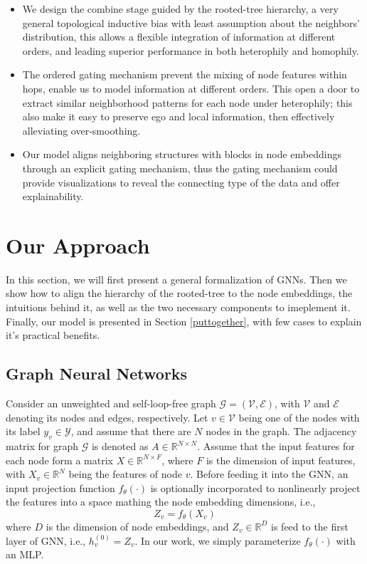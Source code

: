 \documentclass{article}
\begin{document}
\begin{itemize}
\item We design the combine stage guided by the rooted-tree hierarchy, a very general topological inductive bias with least assumption about the neighbors' distribution, this allows a flexible integration of information at different orders, and leading superior performance in both heterophily and homophily.


\item The ordered gating mechanism prevent the mixing of node features within hops, enable us to model information at different orders. This open a door to extract similar neighborhood patterns for each node under heterophily; this also make it easy to preserve ego and local information, then effectively alleviating over-smoothing.


\item Our model aligns neighboring structures with blocks in node embeddings through an explicit gating mechanism, thus the gating mechanism could provide visualizations to reveal the connecting type of the data and offer explainability.
\end{itemize}


\section{Our Approach}
In this section, we will first present a general formalization of GNNs. Then we show how to align the hierarchy of the rooted-tree to the node embeddings, the intuitions behind it, as well as the two necessary components to imeplement it. Finally, our model is presented in Section \ref{puttogether}, with few cases to explain it's practical benefits.

\subsection{Graph Neural Networks}
Consider an unweighted and self-loop-free graph $\mathcal{G}=(\mathcal{V},\mathcal{E})$, with $\mathcal{V}$ and $\mathcal{E}$ denoting its nodes and edges, respectively. Let $v \in \mathcal{V}$ being one of the nodes with its label $y_{v} \in \mathcal{Y}$, and assume that there are $N$ nodes in the graph. The adjacency matrix for graph $\mathcal{G}$ is denoted as $A \in \mathbb{R}^{N \times N}$.
Assume that the input features for each node form a matrix $X \in \mathbb{R}^{N \times F}$, where $F$ is the dimension of input features, with $X_v \in \mathbb{R}^N$ being the features of node $v$. Before feeding it into the GNN, an input projection function $f_{\theta}(\cdot)$ is optionally incorporated to nonlinearly project the features into a space mathing the node embedding dimensions, i.e., 
\begin{equation}
Z_v=f_{\theta}(X_v)
\end{equation}
where $D$ is the dimension of node embeddings, and $Z_v \in \mathbb{R}^{D}$ is feed to the first layer of GNN, i.e., $h_{v}^{(0)}=Z_{v}$. In our work, we simply parameterize $f_{\theta}(\cdot)$ with an MLP. 
\end{document}
